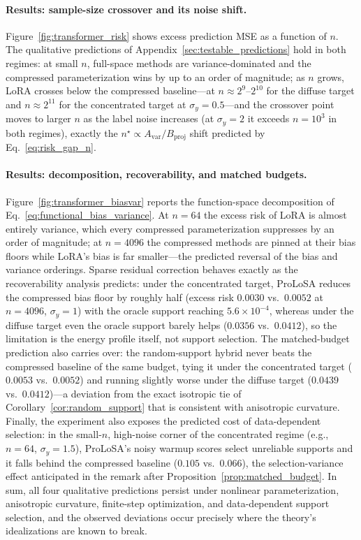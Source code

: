 \paragraph{Results: sample-size crossover and its noise shift.}
Figure~\ref{fig:transformer_risk} shows excess prediction MSE as a
function of $n$.
The qualitative predictions of Appendix~\ref{sec:testable_predictions} hold in
both regimes: at small $n$, full-space methods are variance-dominated and the
compressed parameterization wins by up to an order of magnitude; as $n$
grows, LoRA crosses below the compressed baseline---at
$n\approx 2^9$--$2^{10}$ for the diffuse target and
$n\approx 2^{11}$ for the concentrated target at $\sigma_y=0.5$---and the
crossover point moves to larger $n$ as the label noise increases (at
$\sigma_y=2$ it exceeds $n=10^3$ in both regimes), exactly the
$n^\star\propto A_{\mathrm{var}}/B_{\mathrm{proj}}$ shift predicted by
Eq.~\eqref{eq:risk_gap_n}.

\paragraph{Results: decomposition, recoverability, and matched budgets.}
Figure~\ref{fig:transformer_biasvar} reports the function-space
decomposition of Eq.~\eqref{eq:functional_bias_variance}.
At $n=64$ the excess risk of LoRA is almost entirely variance, which every
compressed parameterization suppresses by an order of magnitude; at $n=4096$
the compressed methods are pinned at their bias floors while LoRA's bias is
far smaller---the predicted reversal of the bias and variance orderings.
Sparse residual correction behaves exactly as the recoverability analysis
predicts: under the concentrated target, ProLoSA reduces the compressed bias
floor by roughly half (excess risk $0.0030$ vs.\ $0.0052$ at $n=4096$,
$\sigma_y=1$) with the oracle support reaching $5.6\times 10^{-4}$, whereas
under the diffuse target even the oracle support barely helps
($0.0356$ vs.\ $0.0412$), so the limitation is the energy profile itself,
not support selection.
The matched-budget prediction also carries over: the random-support hybrid
never beats the compressed baseline of the same budget, tying it under the
concentrated target ($0.0053$ vs.\ $0.0052$) and running slightly worse under
the diffuse target ($0.0439$ vs.\ $0.0412$)---a deviation from the exact
isotropic tie of Corollary~\ref{cor:random_support} that is consistent with
anisotropic curvature.
Finally, the experiment also exposes the predicted cost of data-dependent
selection: in the small-$n$, high-noise corner of the concentrated regime
(e.g., $n=64$, $\sigma_y=1.5$), ProLoSA's noisy warmup scores select
unreliable supports and it falls behind the compressed baseline
($0.105$ vs.\ $0.066$), the selection-variance effect anticipated in the
remark after Proposition~\ref{prop:matched_budget}.
In sum, all four qualitative predictions persist under nonlinear
parameterization, anisotropic curvature, finite-step optimization, and
data-dependent support selection, and the observed deviations occur precisely
where the theory's idealizations are known to break.

